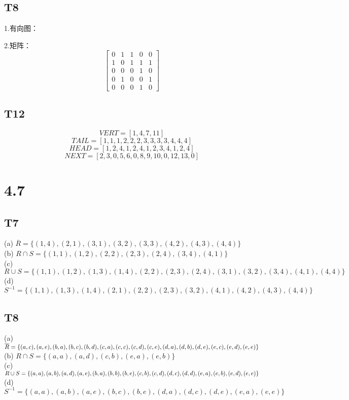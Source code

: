 \documentclass{article}
\begin{document}
\subsection{T8}
1.有向图：\\

2.矩阵：
$$
\begin{bmatrix}
    0 & 1 & 1 & 0 & 0\\
    1 & 0 & 1 & 1 & 1\\
    0 & 0 & 0 & 1 & 0\\
    0 & 1 & 0 & 0 & 1\\
    0 & 0 & 0 & 1 & 0
\end{bmatrix}
$$
\subsection{T12}
$$VERT = [1, 4, 7, 11]$$
$$TAIL = [1, 1, 1, 2, 2, 2, 3, 3, 3, 3, 4, 4, 4]$$
$$HEAD = [1, 2, 4, 1, 2, 4, 1, 2, 3, 4, 1, 2, 4]$$
$$NEXT = [2, 3, 0, 5, 6, 0, 8, 9, 10, 0, 12, 13, 0]$$
\section{4.7}
\subsection{T7}
(a) $\overline{R} = \{(1, 4), (2, 1), (3, 1), (3, 2), (3, 3), (4, 2), (4, 3), (4, 4)\}$\\
(b) $R \cap S = \{(1, 1), (1, 2), (2, 2), (2, 3), (2, 4), (3, 4), (4, 1)\}$\\
(c) $R \cup S = \{(1, 1), (1, 2), (1, 3), (1, 4), (2, 2), (2, 3), (2, 4), (3, 1), (3, 2), (3, 4), (4, 1), (4, 4)\}$\\
(d) $S^{-1} = \{(1, 1), (1, 3), (1, 4), (2, 1), (2, 2), (2, 3), (3, 2), (4, 1), (4, 2), (4, 3), (4, 4)\}$  
\subsection{T8}
(a) $\overline{R} = \{(a, c), (a, e), (b, a), (b, c), (b, d), (c, a), (c, c), (c, d), (c, e), (d, a), (d, b),\\
(d, e), (e, c), (e, d), (e, e)\}$\\
(b) $R \cap S = \{(a, a), (a, d), (c, b), (e, a), (e, b)\}$\\
(c) $R \cup S = \{(a, a), (a, b), (a, d), (a, e), (b, a), (b, b), (b, e), (c, b), (c, d), (d, c), (d, d),\\
(e, a), (e, b), (e, d), (e, e)\}$\\
(d) $S^{-1} = \{(a, a), (a, b), (a, e), (b, c), (b, e), (d, a), (d, c), (d, e), (e, a), (e, e)\}$
\end{document}

